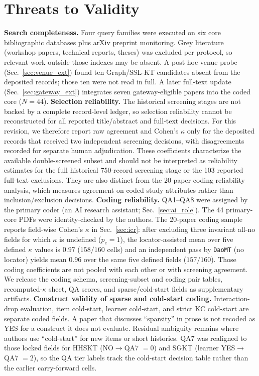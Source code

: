 \documentclass[lettersize,journal]{IEEEtran}
\begin{document}
\section{Threats to Validity}
\label{sec:validity}
\textbf{Search completeness.} Four query families were executed on six core bibliographic databases plus arXiv preprint monitoring. Grey literature (workshop papers, technical reports, theses) was excluded per protocol, so relevant work outside those indexes may be absent. A post hoc venue probe (Sec.~\ref{sec:venue_ext}) found ten Graph/SSL-KT candidates absent from the deposited records; those ten were not read in full. A later full-text update (Sec.~\ref{sec:gateway_ext}) integrates seven gateway-eligible papers into the coded core ($N=44$).
\textbf{Selection reliability.} The historical screening stages are not backed by a complete record-level ledger, so selection reliability cannot be reconstructed for all reported title/abstract and full-text decisions. For this revision, we therefore report raw agreement and Cohen's $\kappa$ only for the deposited records that received two independent screening decisions, with disagreements recorded for separate human adjudication. These coefficients characterize the available double-screened subset and should not be interpreted as reliability estimates for the full historical 750-record screening stage or the 103 reported full-text exclusions. They are also distinct from the 20-paper coding reliability analysis, which measures agreement on coded study attributes rather than inclusion/exclusion decisions.
\textbf{Coding reliability.} QA1--QA8 were assigned by the primary coder (an AI research assistant; Sec.~\ref{sec:ai_role}). The 44 primary-core PDFs were identity-checked by the authors. The 20-paper coding sample reports field-wise Cohen's $\kappa$ in Sec.~\ref{sec:icr}: after excluding three invariant all-no fields for which $\kappa$ is undefined ($p_e=1$), the locator-assisted mean over five defined $\kappa$ values is $0.97$ ($158/160$ cells) and an independent pass by \texttt{DaoMT} (no locator) yields mean $0.96$ over the same five defined fields ($157/160$). Those coding coefficients are not pooled with each other or with screening agreement. We release the coding schema, screening-subset and coding pair tables, recomputed-$\kappa$ sheet, QA scores, and sparse/cold-start fields as supplementary artifacts.
\textbf{Construct validity of sparse and cold-start coding.} Interaction-drop evaluation, item cold-start, learner cold-start, and strict KC cold-start are separate coded fields. A paper that discusses ``sparsity'' in prose is not recoded as YES for a construct it does not evaluate. Residual ambiguity remains where authors use ``cold-start'' for new items or short histories. QA7 was realigned to those locked fields for HHSKT (NO$\rightarrow$QA7 $=0$) and SGKT (learner YES$\rightarrow$QA7 $=2$), so the QA tier labels track the cold-start decision table rather than the earlier carry-forward cells.
\end{document}
